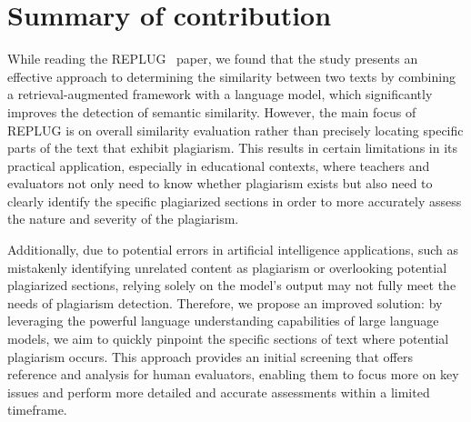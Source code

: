 \section{Summary of contribution}
While reading the REPLUG~\cite{REPLUG} paper, we found that the study presents an effective approach to determining the similarity between two texts by combining a retrieval-augmented framework with a language model, which significantly improves the detection of semantic similarity. However, the main focus of REPLUG is on overall similarity evaluation rather than precisely locating specific parts of the text that exhibit plagiarism. This results in certain limitations in its practical application, especially in educational contexts, where teachers and evaluators not only need to know whether plagiarism exists but also need to clearly identify the specific plagiarized sections in order to more accurately assess the nature and severity of the plagiarism.

Additionally, due to potential errors in artificial intelligence applications, such as mistakenly identifying unrelated content as plagiarism or overlooking potential plagiarized sections, relying solely on the model's output may not fully meet the needs of plagiarism detection. Therefore, we propose an improved solution: by leveraging the powerful language understanding capabilities of large language models, we aim to quickly pinpoint the specific sections of text where potential plagiarism occurs. This approach provides an initial screening that offers reference and analysis for human evaluators, enabling them to focus more on key issues and perform more detailed and accurate assessments within a limited timeframe.
